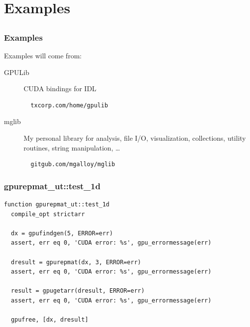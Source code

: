 \documentclass[12pt, handout]{beamer}
\begin{document}
\section{Examples}
\subsection*{}

\begin{frame}[t, fragile]
  \hypertarget{examples}{}
  \frametitle{Examples}
  Examples will come from:

  \begin{description}
    \item[GPULib] CUDA bindings for IDL
\begin{lstlisting}
  txcorp.com/home/gpulib
\end{lstlisting}
\hyperlink{gpulib}{}

    \item[mglib] My personal library for analysis, file I/O, visualization, collections, utility routines, string manipulation, \ldots
\begin{lstlisting}
  gitgub.com/mgalloy/mglib
\end{lstlisting}
  \end{description}
\end{frame}

\begin{frame}[t, fragile]
  \frametitle{gpurepmat\_ut::test\_1d}

\begin{lstlisting}[basicstyle=\ttfamily\fontsize{8pt}{8pt}\selectfont]
function gpurepmat_ut::test_1d
  compile_opt strictarr

  dx = gpufindgen(5, ERROR=err)
  assert, err eq 0, 'CUDA error: %s', gpu_errormessage(err)

  dresult = gpurepmat(dx, 3, ERROR=err)
  assert, err eq 0, 'CUDA error: %s', gpu_errormessage(err)

  result = gpugetarr(dresult, ERROR=err)
  assert, err eq 0, 'CUDA error: %s', gpu_errormessage(err)

  gpufree, [dx, dresult]
\end{lstlisting}
\end{frame}
\end{document}
